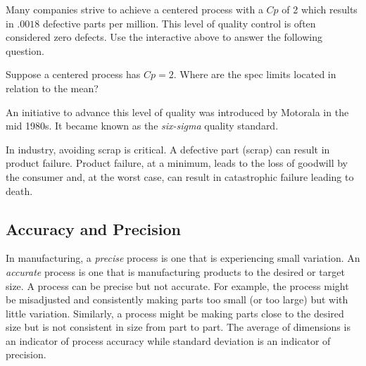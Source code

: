 \documentclass{ximera}
\begin{document}
\begin{onlineOnly}
\begin{center} 
\end{center}
\end{onlineOnly}

Many companies strive to achieve a centered process with a $Cp$ of 2 which results in $.0018$ defective parts per million.  This level of quality control is often considered zero defects. Use the interactive above to answer the following question.

\begin{question}
    Suppose a centered process has $Cp=2$.  Where are the spec limits located in relation to the mean?
    \begin{multipleChoice}
    \end{multipleChoice}

An initiative to advance this level of quality was introduced by Motorala in the mid 1980s.  It became known as the \emph{six-sigma} quality standard.
  \end{question}
 

In industry, avoiding scrap is critical. A defective part (scrap) can result in product failure. Product failure, at a minimum, leads to the loss of goodwill by the consumer and, at the worst case, can result in catastrophic failure leading to death.

\subsection*{Accuracy and Precision}

In manufacturing, a \emph{precise} process is one that is experiencing small variation. An \emph{accurate} process is one that is manufacturing products to the desired or target size. A process can be precise but not accurate. For example, the process might be misadjusted and consistently making parts too small (or too large) but with little variation.  Similarly, a process might be making parts close to the desired size but is not consistent in size from part to part.  The average of dimensions is an indicator of process accuracy while standard deviation is an indicator of precision. 
\end{document}
